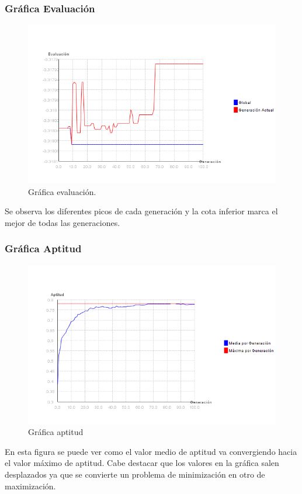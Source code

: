 \documentclass[12pt]{article}
\begin{document}
\subsubsection*{Gráfica Evaluación}
\begin{figure}[H]
\centering
\includegraphics[scale=0.4]{graficas/F3inicial_algoritmo}
\caption{Gráfica evaluación.}
\label{fig}
\end{figure}
	Se observa los diferentes picos de cada generación y la cota inferior marca el mejor de todas las generaciones.

\subsubsection*{Gráfica Aptitud}
\begin{figure}[H]
\centering
\includegraphics[scale=0.4]{graficas/F3inicial_aptitud}
\caption{Gráfica aptitud}
\label{fig}
\end{figure}
	En esta figura se puede ver como el valor medio de aptitud va convergiendo hacia el valor máximo de aptitud. Cabe destacar que los valores en la gráfica salen desplazados ya que se convierte un problema de minimización en otro de maximización.
\end{document}
